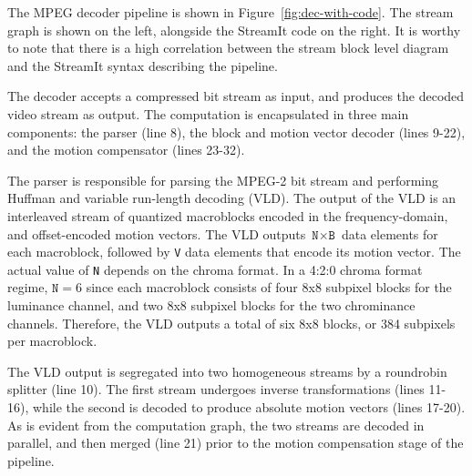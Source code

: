 \begin{figure*}[t]
  \centerline{}
  \caption{MPEG-2 decoder block diagram and corresponding StreamIt code.}
  \label{fig:dec-with-code}
\end{figure*}


The MPEG decoder pipeline is shown in
Figure~\ref{fig:dec-with-code}. The stream graph is shown on the left,
alongside the StreamIt code on the right. It is worthy to note that
there is a high correlation between the stream block level diagram and
the StreamIt syntax describing the pipeline.

The decoder accepts a compressed bit stream as input, and produces the
decoded video stream as output. The computation is encapsulated in
three main components: the parser (line 8), the block and motion vector
decoder (lines 9-22), and the motion compensator (lines 23-32).

The parser is responsible for parsing the MPEG-2 bit stream and
performing Huffman and variable run-length decoding (VLD). The output
of the VLD is an interleaved stream of quantized macroblocks encoded
in the frequency-domain, and offset-encoded motion vectors. The VLD
outputs $\texttt{N}\times\texttt{B}$ data elements for each
macroblock, followed by \texttt{V} data elements that encode its
motion vector. The actual value of \texttt{N} depends on the chroma
format. In a 4:2:0 chroma format regime, $\texttt{N}=6$ since each
macroblock consists of four 8x8 subpixel blocks for the luminance channel,
and two 8x8 subpixel blocks for the two chrominance
channels. Therefore, the VLD outputs a total of six 8x8 blocks,
or 384 subpixels per macroblock.

The VLD output is segregated into two homogeneous streams by a
roundrobin splitter (line 10). The first stream undergoes inverse
transformations (lines 11-16), while the second is decoded to produce
absolute motion vectors (lines 17-20). As is evident from the computation
graph, the two streams are decoded in parallel, and then merged (line
21) prior to the motion compensation stage of the pipeline.

